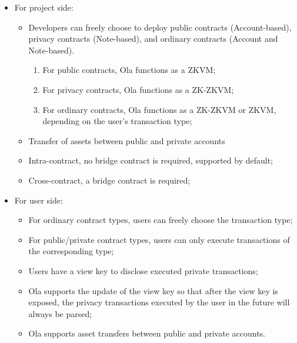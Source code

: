 \begin{itemize}
\item For project side:
    \begin{itemize}
    \item Developers can freely choose to deploy public contracts (Account-based), privacy contracts (Note-based), and ordinary contracts (Account and Note-based).
        \begin{enumerate}
        \item For public contracts, Ola functions as a ZKVM;
        \item For privacy contracts, Ola functions as a ZK-ZKVM;
        \item For ordinary contracts, Ola functions as a ZK-ZKVM or ZKVM, depending on the user's transaction type;
        \end{enumerate}
    \item Transfer of assets between public and private accounts
    \item Intra-contract, no bridge contract is required, supported by default;
    \item Cross-contract, a bridge contract is required;
    \end{itemize}
\item For user side:
    \begin{itemize}
    \item For ordinary contract types, users can freely choose the transaction type;
    \item For public/private contract types, users can only execute transactions of the corresponding type;
    \item Users have a view key to disclose executed private transactions;
    \item Ola supports the update of the view key so that after the view key is exposed, the privacy transactions executed by the user in the future will always be parsed;
    \item Ola supports asset transfers between public and private accounts.
    \end{itemize}
\end{itemize}
